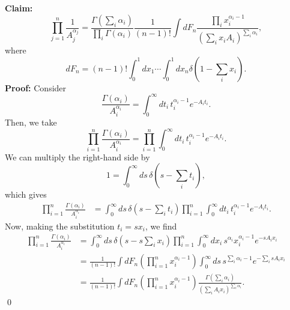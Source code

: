 \noindent\textbf{Claim:}
\begin{equation}
    \prod_{j=1}^n\frac{1}{A_j^{\alpha_j}} = \frac{\Gamma(\sum_i\alpha_i)}{\prod_i\Gamma(\alpha_i)}\frac{1}{(n-1)!}\int dF_n \frac{\prod_ix_i^{\alpha_i-1}}{(\sum_ix_iA_i)^{\sum_i\alpha_i}},
\end{equation}
where
\begin{equation}
    dF_n = (n-1)!\int_0^1dx_1\cdots\int^1_0 dx_n \delta(1-\sum_ix_i).
\end{equation}
\noindent\textbf{Proof:}
Consider
\begin{equation}
    \frac{\Gamma(\alpha_i)}{A_i^{\alpha_i}} = \int_0^\infty dt_i\, t_i^{\alpha_i-1}e^{-A_it_i}.
\end{equation}
Then, we take
\begin{equation}
    \prod_{i=1}^n \frac{\Gamma(\alpha_i)}{A_i^{\alpha_i}} = \prod_{i=1}^n\int_0^\infty dt_i\, t_i^{\alpha_i-1}e^{-A_it_i}.
\end{equation}
We can multiply the right-hand side by
\begin{equation}
    1 = \int^\infty_0ds\,\delta(s-\sum_it_i),
\end{equation}
which gives
\begin{equation}
\begin{aligned}
    \prod_{i=1}^n \frac{\Gamma(\alpha_i)}{A_i^{\alpha_i}} &= \int^\infty_0ds\,\delta(s-\sum_it_i)\prod_{i=1}^n\int_0^\infty dt_i\, t_i^{\alpha_i-1}e^{-A_it_i}.
\end{aligned}
\end{equation}
Now, making the substitution $t_i =sx_i$, we find
\begin{equation}
\begin{aligned}
    \prod_{i=1}^n \frac{\Gamma(\alpha_i)}{A_i^{\alpha_i}} &= \int^\infty_0ds\,\delta(s-s\sum_ix_i)\prod_{i=1}^n\int_0^\infty dx_i\, s^{\alpha_i}x_i^{\alpha_i-1}e^{-sA_ix_i}\\
    &=\frac{1}{(n-1)!}\int dF_n\left(\prod_{i=1}^nx_i^{\alpha_i-1}\right)\int ^\infty_0 ds\,s^{\sum_i \alpha_i -1}e^{-\sum_isA_ix_i}\\
    &=\frac{1}{(n-1)!}\int dF_n\left(\prod_{i=1}^nx_i^{\alpha_i-1}\right)\frac{\Gamma(\sum_i\alpha_i)}{(\sum_iA_ix_i)^{\sum_i\alpha_i}}.
\end{aligned}
\end{equation}
\qed

